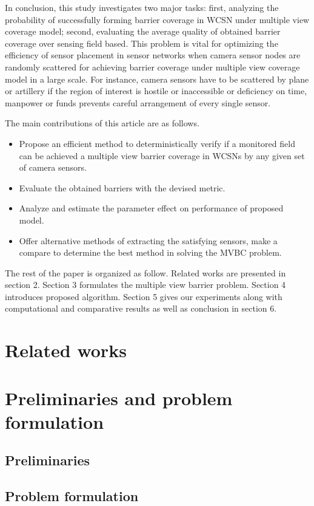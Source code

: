 \documentclass[3p]{elsarticle}
\begin{document}
In conclusion, this study investigates two major tasks: first, analyzing the probability of successfully forming barrier coverage in WCSN under multiple view coverage model; second, evaluating the average quality of obtained barrier coverage over sensing field based. This problem is vital for optimizing the efficiency of sensor placement in sensor networks when camera sensor nodes are randomly scattered for achieving barrier coverage under multiple view coverage model in a large scale. For instance, camera sensors have to be scattered by plane or artillery if the region of interest is hostile or inaccessible or deficiency on time, manpower or funds prevents careful arrangement of every single sensor.\par
%
The main contributions of this article are as follows. 
\begin{itemize}
	\item Propose an efficient method to deterministically verify if a monitored field can be achieved a multiple view barrier coverage in WCSNs by any given set of camera sensors. 
	\item Evaluate the obtained barriers with the devised metric.
	\item Analyze and estimate the parameter effect on performance of proposed model.
	\item Offer alternative methods of extracting the satisfying sensors, make a compare to determine the best method in solving the MVBC problem.
\end{itemize}
%
The rest of the paper is organized as follow. Related works are presented in section 2. Section 3 formulates the multiple view barrier problem. Section 4 introduces proposed algorithm. Section 5 gives our experiments along with computational and comparative results as well as conclusion in section 6.
%

\section{Related works}


\section{Preliminaries and problem formulation}
\subsection{Preliminaries}


\subsection{Problem formulation}

\end{document}
